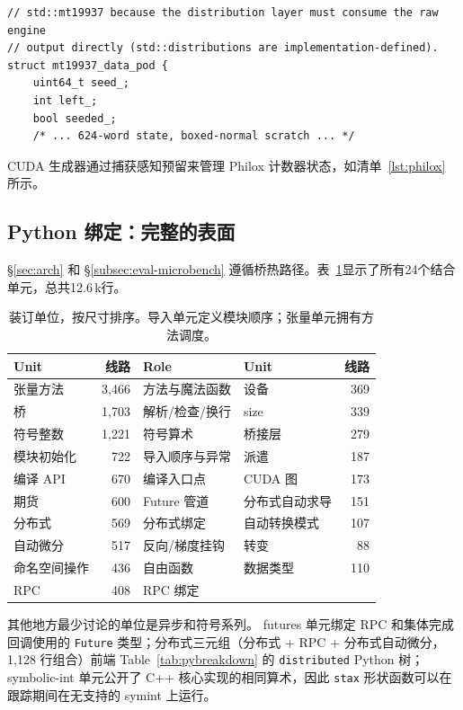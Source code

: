 \begin{lstlisting}[caption={The CPU engine is a literal Mersenne Twister pod; distributions read raw words.}, label=lst:mt]
// std::mt19937 because the distribution layer must consume the raw engine
// output directly (std::distributions are implementation-defined).
struct mt19937_data_pod {
    uint64_t seed_;
    int left_;
    bool seeded_;
    /* ... 624-word state, boxed-normal scratch ... */
\end{lstlisting}

CUDA 生成器通过捕获感知预留来管理 Philox 计数器状态，如清单~\ref{lst:philox} 所示。

\subsection{Python 绑定：完整的表面}
\label{subsec:eval-bindings}

\S\ref{sec:arch} 和 \S\ref{subsec:eval-microbench} 遵循桥热路径。表~\ref{tab:bindings}显示了所有24个结合单元，总共12.6\,k行。

\begin{table}[H]
\centering
\caption{装订单位，按尺寸排序。导入单元定义模块顺序；张量单元拥有方法调度。}
\label{tab:bindings}
\small
\begin{tabular}{lrllr}
\toprule
Unit & 线路 & Role & Unit & 线路 \\
\midrule
张量方法 & 3{,}466 & 方法与魔法函数 & 设备 & 369 \\
桥 & 1{,}703 & 解析/检查/换行 & size & 339 \\
符号整数 & 1{,}221 & 符号算术 & 桥接层 & 279 \\
模块初始化 & 722 & 导入顺序与异常 & 派遣 & 187 \\
编译 API & 670 & 编译入口点 & CUDA 图 & 173 \\
期货 & 600 & Future 管道 & 分布式自动求导 & 151 \\
分布式 & 569 & 分布式绑定 & 自动转换模式 & 107 \\
自动微分 & 517 & 反向/梯度挂钩 & 转变 & 88 \\
命名空间操作 & 436 & 自由函数 & 数据类型 & 110 \\
RPC & 408 & RPC 绑定 &  & \\
\bottomrule
\end{tabular}
\end{table}

其他地方最少讨论的单位是异步和符号系列。 futures 单元绑定 RPC 和集体完成回调使用的 \texttt{Future} 类型；分布式三元组（分布式 + RPC + 分布式自动微分，1{,}128 行组合）前端 Table~\ref{tab:pybreakdown} 的 \texttt{distributed} Python 树； symbolic-int 单元公开了 C++ 核心实现的相同算术，因此 \texttt{stax} 形状函数可以在跟踪期间在无支持的 symint 上运行。

